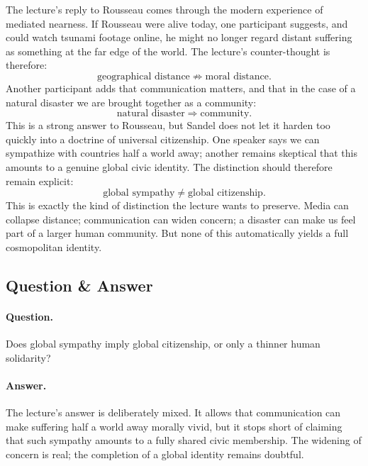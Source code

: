 The lecture's reply to Rousseau comes through the modern experience of mediated nearness. If Rousseau were alive today, one participant suggests, and could watch tsunami footage online, he might no longer regard distant suffering as something at the far edge of the world. The lecture's counter-thought is therefore:
\begin{equation}
\text{geographical distance}
\not\Rightarrow
\text{moral distance}.
\end{equation}
Another participant adds that communication matters, and that in the case of a natural disaster we are brought together as a community:
\begin{equation}
\text{natural disaster}
\Longrightarrow
\text{community}.
\end{equation}
This is a strong answer to Rousseau, but Sandel does not let it harden too quickly into a doctrine of universal citizenship. One speaker says we can sympathize with countries half a world away; another remains skeptical that this amounts to a genuine global civic identity. The distinction should therefore remain explicit:
\begin{equation}
\text{global sympathy}
\neq
\text{global citizenship}.
\end{equation}
This is exactly the kind of distinction the lecture wants to preserve. Media can collapse distance; communication can widen concern; a disaster can make us feel part of a larger human community. But none of this automatically yields a full cosmopolitan identity.

\subsection{Question \& Answer}

\paragraph{Question.} Does global sympathy imply global citizenship, or only a thinner human solidarity?

\paragraph{Answer.} The lecture's answer is deliberately mixed. It allows that communication can make suffering half a world away morally vivid, but it stops short of claiming that such sympathy amounts to a fully shared civic membership. The widening of concern is real; the completion of a global identity remains doubtful.

